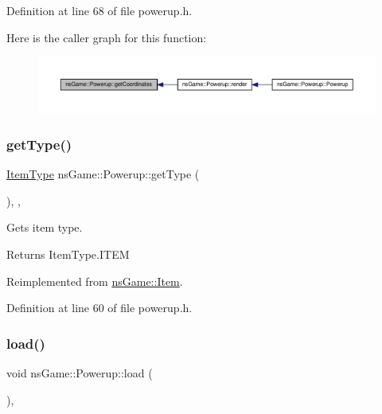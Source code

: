 Definition at line 68 of file powerup.\+h.

Here is the caller graph for this function\+:\nopagebreak
\begin{figure}[H]
\begin{center}
\leavevmode
\includegraphics[width=350pt]{classns_game_1_1_powerup_a31700271cd7bd2040d26bcac7f437408_icgraph}
\end{center}
\end{figure}
\mbox{\label{classns_game_1_1_powerup_a34f105d75a90ddbbc6afa46c83bdccf6}} 
\subsubsection{\texorpdfstring{get\+Type()}{getType()}}
{\footnotesize\ttfamily \hyperlink{namespacens_game_a5f7db01e6447720e9a145f0b3c68a4d7}{Item\+Type} ns\+Game\+::\+Powerup\+::get\+Type (\begin{DoxyParamCaption}{ }\end{DoxyParamCaption})\hspace{0.3cm}{\ttfamily [inline]}, {\ttfamily [override]}, {\ttfamily [virtual]}}



Gets item type. 

\begin{DoxyReturn}{Returns}
Item\+Type.\+I\+T\+EM 
\end{DoxyReturn}


Reimplemented from \hyperlink{structns_game_1_1_item_a69156550e5083928cbb673ca2db671f5}{ns\+Game\+::\+Item}.



Definition at line 60 of file powerup.\+h.

\mbox{\label{classns_game_1_1_powerup_a2a228e8f89bed454ad8011dfd88068c6}} 
\subsubsection{\texorpdfstring{load()}{load()}}
{\footnotesize\ttfamily void ns\+Game\+::\+Powerup\+::load (\begin{DoxyParamCaption}{ }\end{DoxyParamCaption})\hspace{0.3cm}{\ttfamily [override]}, {\ttfamily [virtual]}}




